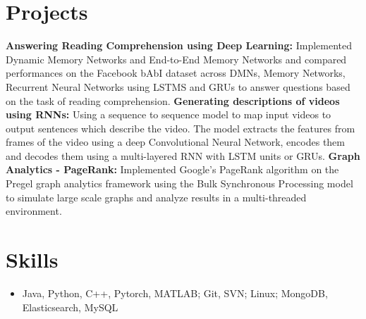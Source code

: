 \documentclass[letterpaper]{article}
\begin{document}
\section*{Projects}
\textbf{Answering Reading Comprehension using Deep Learning:}
Implemented Dynamic Memory Networks and End-to-End Memory Networks and compared performances on the Facebook bAbI dataset across DMNs, Memory Networks, Recurrent Neural Networks using LSTMS and GRUs  to answer questions based on the task of reading comprehension. 
\vspace{1mm} \newline
\textbf{Generating descriptions of videos using RNNs:}
Using a sequence to sequence model to map input videos to output sentences which describe the video. The model extracts the features from frames of the video using a deep Convolutional Neural Network, encodes them and decodes them using a multi-layered RNN with LSTM units or GRUs.
\vspace{1mm} \newline
\textbf{Graph Analytics - PageRank:} 
Implemented Google's PageRank algorithm on the Pregel graph analytics framework using the Bulk Synchronous Processing model to simulate large scale graphs and analyze results in a multi-threaded environment.

\section*{Skills}
\begin{itemize}
\item Java, Python, C++, Pytorch, MATLAB; Git, SVN; Linux; MongoDB, Elasticsearch, MySQL
\end{itemize}
\end{document}
